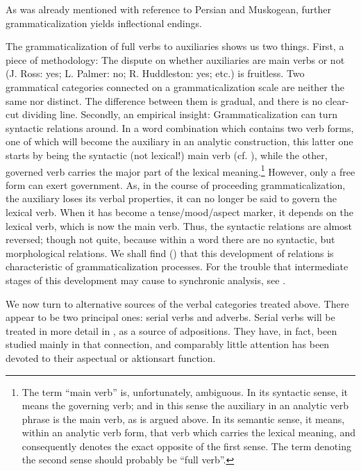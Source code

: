 As was already mentioned with reference to Persian and Muskogean, further grammaticalization yields inflectional endings.

The grammaticalization of full verbs to auxiliaries shows us two things. First, a piece of methodology: The dispute on whether auxiliaries are main verbs or not (J. Ross: yes; L. Palmer: no; R. Huddleston: yes; etc.) is fruitless. Two grammatical categories connected on a grammaticalization scale are neither the same nor distinct. The difference between them is gradual, and there is no clear-cut dividing line. Secondly, an empirical insight: Grammaticalization can turn syntactic relations around. In a word combination which contains two verb forms, one of which will become the auxiliary in an analytic construction, this latter one starts by being the syntactic (not lexical!) main verb (cf. \citealt[96f]{Givón1979}), while the other, governed verb carries the major part of the lexical meaning.\footnote{The term ``main verb'' is, unfortunately, ambiguous. In its syntactic sense, it means the governing verb; and in this sense the auxiliary in an analytic verb phrase is the main verb, as is argued above. In its semantic sense, it means, within an analytic verb form, that verb which carries the lexical meaning, and consequently denotes the exact opposite of the first sense. The term denoting the second sense should probably be ``full verb''.} However, only a free form can exert government. As, in the course of proceeding grammaticalization, the auxiliary loses its verbal properties, it can no longer be said to govern the lexical verb.\label{page36} When it has become a tense/mood/aspect marker, it depends on the lexical verb, which is now the main verb. Thus, the syntactic relations are almost reversed; though not quite, because within a word there are no syntactic, but morphological relations. We shall find () that this development of relations is characteristic of grammaticalization processes. For the trouble that intermediate stages of this development may cause to synchronic analysis, see \citet[155f]{Matthews1981}.

\newpage
We now turn to alternative sources of the verbal categories treated above. There appear to be two principal ones: serial verbs and adverbs. Serial verbs will be treated in more detail in , as a source of adpositions. They have, in fact, been studied mainly in that connection, and comparably little attention has been devoted to their aspectual or aktionsart function.

